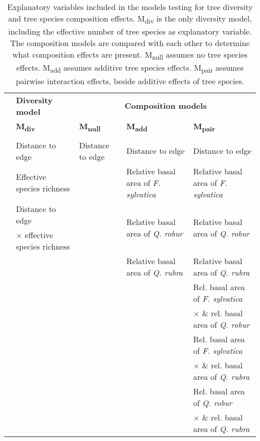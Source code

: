 \documentclass[b5paper,10pt]{book} %
\begin{document}
	\begin{sidewaystable}
	  \begin{center}
	 \begin{footnotesize}
	    \caption{Explanatory variables included in the models testing for tree diversity and tree species composition effects. M\textsubscript{div} is the only diversity model, including the effective number of tree species as explanatory variable. The composition models are compared with each other to determine what composition effects are present. M\textsubscript{null} assumes no tree species effects. M\textsubscript{add} assumes additive tree species effects. M\textsubscript{pair} assumes pairwise interaction effects, beside additive effects of tree species.}
	    \label{Tab3.1}
	    \begin{tabular}{c l l l l}
 	     \toprule
	  	& \textbf{Diversity model} & \multicolumn{3}{c}{\textbf{Composition models}} \\
 	     	& \textbf{M\textsubscript{div}}  & \textbf{M\textsubscript{null}} & \textbf{M\textsubscript{add}} & \textbf{ M\textsubscript{pair}}\\
		& & & & \\
		\multirow{11}{*}{\rotatebox{90}{\textbf{Explanatory variables}}} & Distance to edge & Distance to edge & Distance to edge & Distance to edge\\
		\multirow{11}{*}{} & Effective species richness & & Relative basal area of \textit{F. sylvatica} & Relative basal area of \textit{F. sylvatica} \\
		\multirow{11}{*}{} & Distance to edge & & \multirow{2}{*}{Relative basal area of \textit{Q. robur}} & \multirow{2}{*}{Relative basal area of \textit{Q. robur}} \\ 
		\multirow{11}{*}{} & $\times$ effective species richness & & \multirow{2}{*}{} & \multirow{2}{*}{} \\ 
		\multirow{11}{*}{} & & & Relative basal area of \textit{Q. rubra} & Relative basal area of \textit{Q. rubra}  \\
		\multirow{11}{*}{} & & & & Rel. basal area of \textit{F. sylvatica} \\ 
		\multirow{11}{*}{} & & & & $\times$ \& rel. basal area of \textit{Q. robur} \\
		\multirow{11}{*}{} & & & & Rel. basal area of \textit{F. sylvatica} \\
		\multirow{11}{*}{} & & & & $\times$ \& rel. basal area of \textit{Q. rubra} \\
		\multirow{11}{*}{} & & & & Rel. basal area of \textit{Q. robur} \\
		\multirow{11}{*}{} & & & & $\times$ \& rel. basal area of \textit{Q. rubra} \\
	      \bottomrule
	    \end{tabular}
	\end{footnotesize}
	  \end{center}
	\end{sidewaystable}
\end{document}
